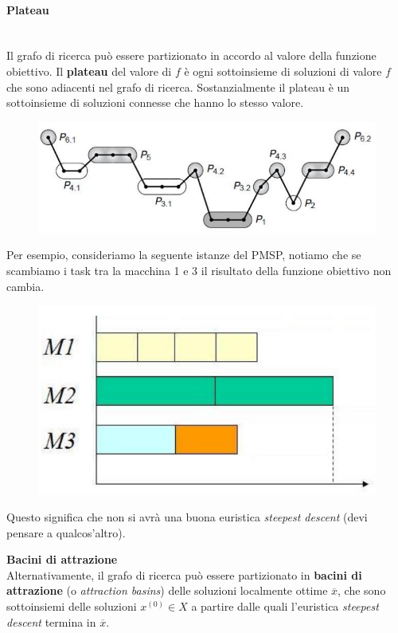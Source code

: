 \documentclass{article}
\begin{document}
\paragraph{Plateau}\mbox{}\\
Il grafo di ricerca può essere partizionato in accordo al valore della funzione obiettivo. Il \textbf{plateau}
del valore di $f$ è ogni sottoinsieme di soluzioni di valore $f$ che sono adiacenti nel grafo di ricerca.
Sostanzialmente il plateau è un sottoinsieme di soluzioni connesse che hanno lo stesso valore.
\begin{figure}[H]
    \centering
    \includegraphics[scale=0.5]{images/plateau.png}
\end{figure}
Per esempio, consideriamo la seguente istanze del PMSP, notiamo che se scambiamo i task tra la macchina 1 e 3
il risultato della funzione obiettivo non cambia.
\begin{figure}[H]
    \centering
    \includegraphics[scale=0.5]{images/plateau2.png}
\end{figure}
Questo significa che non si avrà una buona euristica \textit{steepest descent} (devi pensare a qualcos'altro).

\textbf{Bacini di attrazione}\mbox{}\\
Alternativamente, il grafo di ricerca può essere partizionato in \textbf{bacini di attrazione} (o
\textit{attraction basins}) delle soluzioni localmente ottime $\overline{x}$, che sono sottoinsiemi
delle soluzioni $x^{(0)}\in X$ a partire dalle quali l'euristica \textit{steepest descent} termina in
$\overline{x}$.
\end{document}
